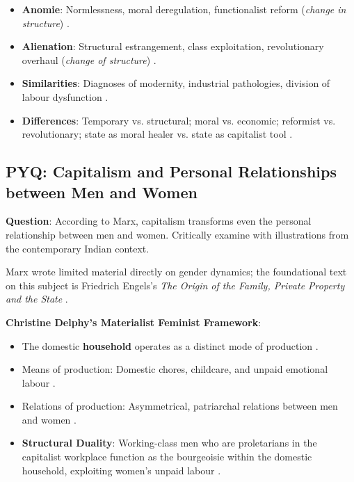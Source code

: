 \begin{QuickRevision}
\begin{itemize}
    \item \textbf{Anomie}: Normlessness, moral deregulation, functionalist reform (\textit{change in structure}) .
    \item \textbf{Alienation}: Structural estrangement, class exploitation, revolutionary overhaul (\textit{change of structure}) .
    \item \textbf{Similarities}: Diagnoses of modernity, industrial pathologies, division of labour dysfunction .
    \item \textbf{Differences}: Temporary vs. structural; moral vs. economic; reformist vs. revolutionary; state as moral healer vs. state as capitalist tool .
\end{itemize}
\end{QuickRevision}

\subsection{PYQ: Capitalism and Personal Relationships between Men and Women}

\begin{PYQLink}
\textbf{Question}: According to Marx, capitalism transforms even the personal relationship between men and women. Critically examine with illustrations from the contemporary Indian context. 
\end{PYQLink}

\begin{CriticalPoint}
Marx wrote limited material directly on gender dynamics; the foundational text on this subject is Friedrich Engels's \textit{The Origin of the Family, Private Property and the State} .
\end{CriticalPoint}

\begin{KeyConcept}
\textbf{Christine Delphy's Materialist Feminist Framework}:
\begin{itemize}
    \item The domestic \textbf{household} operates as a distinct mode of production .
    \item Means of production: Domestic chores, childcare, and unpaid emotional labour .
    \item Relations of production: Asymmetrical, patriarchal relations between men and women .
    \item \textbf{Structural Duality}: Working-class men who are proletarians in the capitalist workplace function as the bourgeoisie within the domestic household, exploiting women's unpaid labour .
\end{itemize}
\end{KeyConcept}

